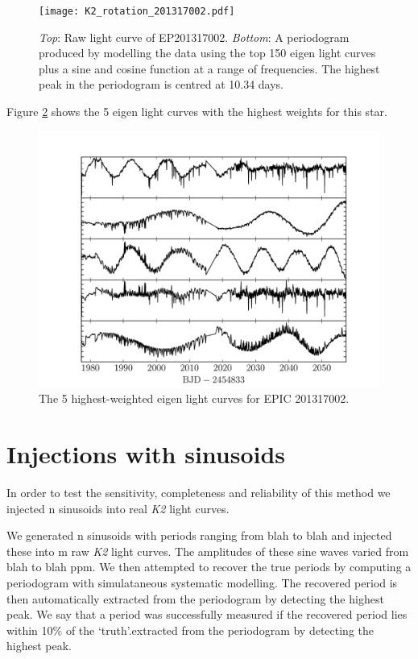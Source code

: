 \documentclass[useAMS, usenatbib]{aastex}
\begin{document}
\begin{figure}
\begin{center}
\texttt{[image: K2\_rotation\_201317002.pdf]}
\caption{{\it Top}: Raw light curve of EP201317002. {\it Bottom}: A
periodogram produced by modelling the data using the top 150 eigen light curves
plus a sine and cosine function at a range of frequencies. The highest peak in
the periodogram is centred at 10.34 days.}
\label{fig:K2_rotation_poster_child}
\end{center}
\end{figure}

Figure \ref{fig:top5} shows the 5 eigen light curves with the highest weights
for this star.

\begin{figure}
\begin{center}
\includegraphics[width=6in, clip=true]{201317002_top5.pdf}
\caption{The 5 highest-weighted eigen light curves for EPIC 201317002.}
\label{fig:top5}
\end{center}
\end{figure}

\section{Injections with sinusoids}

In order to test the sensitivity, completeness and reliability of this method
we injected n sinusoids into real {\it K2} light curves.

We generated n sinusoids with periods ranging from blah to blah and injected
these into m raw {\it K2} light curves.
The amplitudes of these sine waves varied from blah to blah ppm.
We then attempted to recover the true periods by computing a periodogram with
simulataneous systematic modelling.
The recovered period is then automatically extracted from the periodogram by
detecting the highest peak.
We say that a period was successfully measured if the recovered period lies
within 10\% of the `truth'.extracted from the periodogram by
detecting the highest peak.



\end{document}
